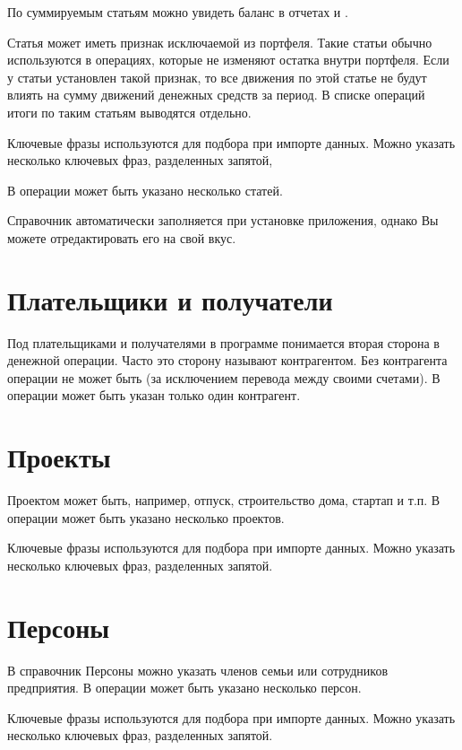 \documentclass[a4paper,10pt,russian]{sphinxmanual}
\begin{document}
По суммируемым статьям можно увидеть баланс в отчетах  и .

Статья может иметь признак исключаемой из портфеля. Такие статьи обычно используются в операциях,
которые не изменяют остатка внутри портфеля. Если у статьи установлен такой признак,
то все движения по этой статье не будут влиять на сумму движений денежных средств за период.
В списке операций итоги по таким статьям выводятся отдельно.

Ключевые фразы используются для подбора при импорте данных. Можно указать несколько ключевых фраз, разделенных запятой,

В операции может быть указано несколько статей.

Справочник автоматически заполняется при установке приложения, однако Вы можете отредактировать его на свой вкус.


\section{Плательщики и получатели}
\label{\detokenize{directories:id7}}
Под плательщиками и получателями в программе понимается вторая сторона в денежной операции. Часто это сторону называют
контрагентом. Без контрагента операции не может быть (за исключением перевода между своими счетами). В операции может быть
указан только один контрагент.


\section{Проекты}
\label{\detokenize{directories:id8}}
Проектом может быть, например, отпуск, строительство дома, стартап и т.п. В операции может быть указано несколько проектов.

Ключевые фразы используются для подбора при импорте данных. Можно указать несколько ключевых фраз, разделенных запятой.


\section{Персоны}
\label{\detokenize{directories:id9}}
В справочник Персоны можно указать членов семьи или сотрудников предприятия. В операции может быть указано несколько персон.

Ключевые фразы используются для подбора при импорте данных. Можно указать несколько ключевых фраз, разделенных запятой.

\noindent{}
\end{document}
